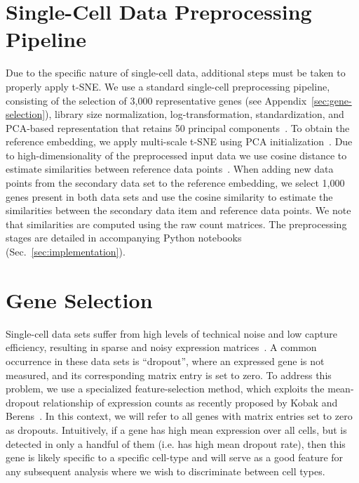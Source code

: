 \documentclass[runningheads]{llncs}
\newcommand{\beginsupplement}{%
  \setcounter{table}{0}
  \renewcommand{\thetable}{S\arabic{table}}%
  \setcounter{figure}{0}
  \renewcommand{\thefigure}{S\arabic{figure}}%
}
\begin{document}
\newpage
\appendix
\beginsupplement

\section{Single-Cell Data Preprocessing Pipeline\label{sec:sc-pipeline}}

Due to the specific nature of single-cell data, additional steps must be taken
to properly apply t-SNE. We use a standard single-cell preprocessing
pipeline, consisting of the selection of 3,000 representative genes
(see Appendix~\ref{sec:gene-selection}), library size normalization,
log-transformation, standardization, and PCA-based representation that
retains 50 principal components~\cite{Stuart2019,Wolf2018}. To obtain the
reference embedding, we apply multi-scale t-SNE using PCA
initialization~\cite{Kobak2019}. Due to high-dimensionality of the
preprocessed input data we use cosine distance to estimate similarities
between reference data points~\cite{Domingos2012}. When adding new data
points from the secondary data set to the reference embedding, we select
1,000 genes present in both data sets and use the cosine similarity to
estimate the similarities between the secondary data item and reference data
points. We note that similarities are computed using the raw count matrices.
The preprocessing stages are detailed in accompanying Python notebooks
(Sec.~\ref{sec:implementation}).

\section{Gene Selection\label{sec:gene-selection}}

Single-cell data sets suffer from high levels of technical noise and low
capture efficiency, resulting in sparse and noisy expression matrices~\cite
{umi}. A common occurrence in these data sets is ``dropout'', where an
expressed gene is not measured, and its corresponding matrix entry is set to
zero. To address this problem, we use a specialized feature-selection method,
which exploits the mean-dropout relationship of expression counts as recently
proposed by Kobak and Berens~\cite{Kobak2019}. In this context, we will refer
to all genes with matrix entries set to zero as dropouts. Intuitively, if a
gene has high mean expression over all cells, but is detected in only a
handful of them (i.e. has high mean dropout rate), then this gene is likely
specific to a specific cell-type and will serve as a good feature for any
subsequent analysis where we wish to discriminate between cell types.
\end{document}
